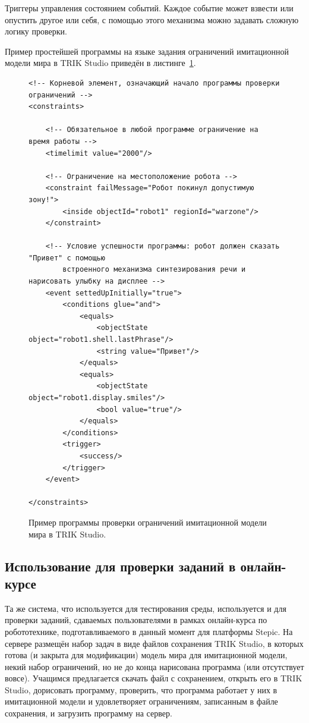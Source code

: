 \documentclass[conference]{IEEEtran}
\begin{document}
Триггеры управления состоянием событий. Каждое событие может взвести или опустить другое или себя, с помощью этого механизма можно задавать сложную логику проверки.

Пример простейшей программы на языке задания ограничений имитационной модели мира в TRIK Studio приведён в листинге~\ref{code:constraints}.

\captionsetup[figure]{name=Листинг}
\setcounter{figure}{0}

\begin{figure}[!t]
\begin{verbatim}
<!-- Корневой элемент, означающий начало программы проверки ограничений -->
<constraints>

    <!-- Обязательное в любой программе ограничение на время работы -->
    <timelimit value="2000"/>

    <!-- Ограничение на местоположение робота -->
    <constraint failMessage="Робот покинул допустимую зону!">
        <inside objectId="robot1" regionId="warzone"/>
    </constraint>

    <!-- Условие успешности программы: робот должен сказать "Привет" с помощью
        встроенного механизма синтезирования речи и нарисовать улыбку на дисплее -->
    <event settedUpInitially="true">
        <conditions glue="and">
            <equals>
                <objectState object="robot1.shell.lastPhrase"/>
                <string value="Привет"/>
            </equals>
            <equals>
                <objectState object="robot1.display.smiles"/>
                <bool value="true"/>
            </equals>
        </conditions>
        <trigger>
            <success/>
        </trigger>
    </event>

</constraints>
\end{verbatim}
	\caption{Пример программы проверки ограничений имитационной модели мира в TRIK Studio.}
	\label{code:constraints}
\end{figure}

\subsection{Использование для проверки заданий в онлайн-курсе}
Та же система, что используется для тестирования среды, используется и для проверки 
заданий, сдаваемых пользователями в рамках онлайн-курса по робототехнике, подготавливаемого 
в данный момент для платформы Stepic. На сервере размещён набор задач в виде файлов 
сохранения TRIK Studio, в которых готова (и закрыта для модификации) модель мира для 
имитационной модели, некий набор ограничений, но не до конца нарисована программа 
(или отсутствует вовсе). Учащимся предлагается скачать файл с сохранением, открыть 
его в TRIK Studio, дорисовать программу, проверить, что программа работает у них в 
имитационной модели и удовлетворяет ограничениям, записанным в файле сохранения, и 
загрузить программу на сервер.
\end{document}
